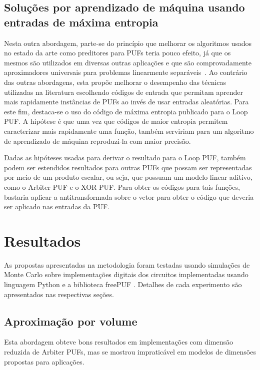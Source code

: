 \documentclass[pdftex,11pt]{article}
\begin{document}
\begin{spacing}{1.5}
\subsection{Soluções por aprendizado de máquina usando entradas de máxima entropia}

Nesta outra abordagem, parte-se do princípio que melhorar os algoritmos usados no estado da arte como preditores para PUFs teria pouco efeito, já que os mesmos são utilizados em diversas outras aplicações e que são comprovadamente aproximadores universais para problemas linearmente separáveis~\cite{WESTREICH2010826}. Ao contrário das outras abordagens, esta propõe melhorar o desempenho das técnicas utilizadas na literatura escolhendo códigos de entrada que permitam aprender mais rapidamente instâncias de PUFs ao invés de usar entradas aleatórias. Para este fim, destaca-se o uso do código de máxima entropia publicado para o Loop PUF. A hipótese é que uma vez que códigos de maior entropia permitem caracterizar mais rapidamente uma função, também serviriam para um algoritmo de aprendizado de máquina reproduzi-la com maior precisão.

Dadas as hipóteses usadas para derivar o resultado para o Loop PUF, também podem ser estendidos resultados para outras PUFs que possam ser representadas por meio de um produto escalar, ou seja, que possuam um modelo linear aditivo, como o Arbiter PUF e o XOR PUF. Para obter os códigos para tais funções, bastaria aplicar a antitransformada sobre o vetor para obter o código que deveria ser aplicado nas entradas da PUF.


\section{Resultados}\label{sec:resultados}

As propostas apresentadas na metodologia foram testadas usando simulações de Monte Carlo sobre implementações digitais dos circuitos implementadas usando linguagem Python e a biblioteca freePUF \cite{freepuf}. Detalhes de cada experimento são apresentados nas respectivas seções.

\subsection{Aproximação por volume}

Esta abordagem obteve bons resultados em implementações
com dimensão reduzida de Arbiter PUFs, mas se mostrou impraticável
em modelos de dimensões propostas para aplicações.


\end{spacing}
\end{document}
